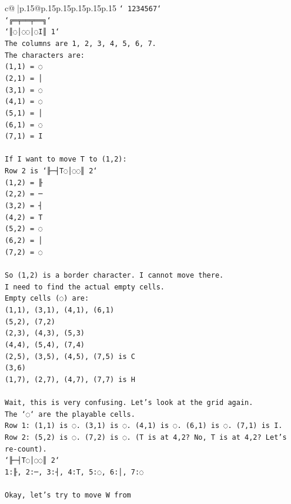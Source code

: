 \documentclass{article}
\begin{document}
{\begin{supertabular}{c@{$\;$}|p{.15\linewidth}@{}p{.15\linewidth}p{.15\linewidth}p{.15\linewidth}p{.15\linewidth}p{.15\linewidth}}
{{{\texttt{` 1234567`} \\
\texttt{`╔═╤══╤══╗`} \\
\texttt{`║◌│◌◌│◌I║ 1`} \\
\texttt{The columns are 1, 2, 3, 4, 5, 6, 7.} \\
\texttt{The characters are:} \\
\texttt{(1,1) = ◌} \\
\texttt{(2,1) = │} \\
\texttt{(3,1) = ◌} \\
\texttt{(4,1) = ◌} \\
\texttt{(5,1) = │} \\
\texttt{(6,1) = ◌} \\
\texttt{(7,1) = I} \\
\\ 
\texttt{If I want to move T to (1,2):} \\
\texttt{Row 2 is `╟─┤T◌│◌◌║ 2`} \\
\texttt{(1,2) = ╟} \\
\texttt{(2,2) = ─} \\
\texttt{(3,2) = ┤} \\
\texttt{(4,2) = T} \\
\texttt{(5,2) = ◌} \\
\texttt{(6,2) = │} \\
\texttt{(7,2) = ◌} \\
\\ 
\texttt{So (1,2) is a border character. I cannot move there.} \\
\texttt{I need to find the actual empty cells.} \\
\texttt{Empty cells (◌) are:} \\
\texttt{(1,1), (3,1), (4,1), (6,1)} \\
\texttt{(5,2), (7,2)} \\
\texttt{(2,3), (4,3), (5,3)} \\
\texttt{(4,4), (5,4), (7,4)} \\
\texttt{(2,5), (3,5), (4,5), (7,5) is C} \\
\texttt{(3,6)} \\
\texttt{(1,7), (2,7), (4,7), (7,7) is H} \\
\\ 
\texttt{Wait, this is very confusing. Let's look at the grid again.} \\
\texttt{The `◌` are the playable cells.} \\
\texttt{Row 1: (1,1) is ◌. (3,1) is ◌. (4,1) is ◌. (6,1) is ◌. (7,1) is I.} \\
\texttt{Row 2: (5,2) is ◌. (7,2) is ◌. (T is at 4,2? No, T is at 4,2? Let's re{-}count).} \\
\texttt{`╟─┤T◌│◌◌║ 2`} \\
\texttt{1:╟, 2:─, 3:┤, 4:T, 5:◌, 6:│, 7:◌} \\
\\ 
\texttt{Okay, let's try to move W from} \\
            }
        }
    }
     \\ \\


\end{supertabular}}
\end{document}
